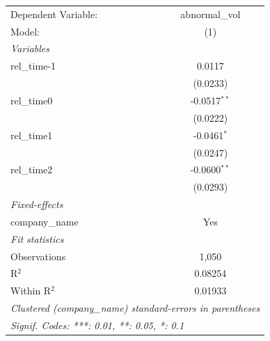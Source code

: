 
\begingroup
\centering
\begin{tabular}{lc}
   \tabularnewline \midrule \midrule
   Dependent Variable: & abnormal\_vol\\   
   Model:              & (1)\\  
   \midrule
   \emph{Variables}\\
   rel\_time-1         & 0.0117\\   
                       & (0.0233)\\   
   rel\_time0          & -0.0517$^{**}$\\   
                       & (0.0222)\\   
   rel\_time1          & -0.0461$^{*}$\\   
                       & (0.0247)\\   
   rel\_time2          & -0.0600$^{**}$\\   
                       & (0.0293)\\   
   \midrule
   \emph{Fixed-effects}\\
   company\_name       & Yes\\  
   \midrule
   \emph{Fit statistics}\\
   Observations        & 1,050\\  
   R$^2$               & 0.08254\\  
   Within R$^2$        & 0.01933\\  
   \midrule \midrule
   \multicolumn{2}{l}{\emph{Clustered (company\_name) standard-errors in parentheses}}\\
   \multicolumn{2}{l}{\emph{Signif. Codes: ***: 0.01, **: 0.05, *: 0.1}}\\
\end{tabular}
\par\endgroup


